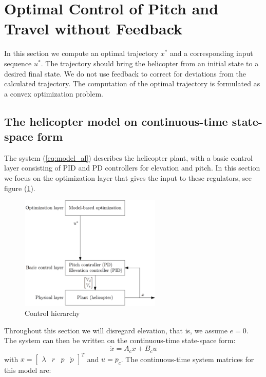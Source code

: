 \section{Optimal Control of Pitch and Travel without Feedback}\label{sec:prob2}

In this section we compute an optimal trajectory $x^*$ and a corresponding input sequence $u^*$. The trajectory should bring the helicopter from an initial state to a desired final state. We do not use feedback to correct for deviations from the calculated trajectory. The computation of the optimal trajectory is formulated as a convex optimization problem.

\subsection{The helicopter model on continuous-time state-space form}
The system (\ref{eq:model_al}) describes the helicopter plant, with a basic control layer consisting of PID and PD controllers for elevation and pitch. In this section we focus on the optimization layer that gives the input to these regulators, see figure (\ref{fig:control_hierarchy}).
\begin{figure}[ht]
    \centering
    \includegraphics[width=0.6\textwidth]{figures/day2/control_hierarchy_day2}
    \caption{Control hierarchy}
    \label{fig:control_hierarchy}
\end{figure}
Throughout this section we will disregard elevation, that is, we assume $e = 0$.
The system can then be written on the continuous-time state-space form:
\begin{equation}
    \dot{x} = A_cx + B_cu
    \label{eq:state_space_axbu}
\end{equation}
with $x = \begin{bmatrix} \lambda & r & p & \dot{p} \end{bmatrix}^T$ and $u = p_c$.
The continuous-time system matrices for this model are:
